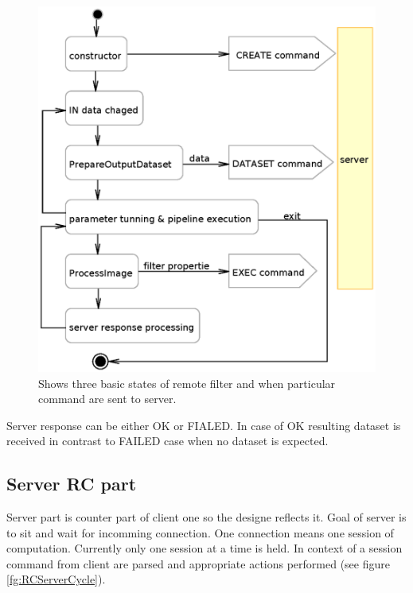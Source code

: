 \begin{figure}
    \centering
    \includegraphics[width=12cm]{data/RCClientCycle}
    \caption[Remote Medv4D filter]{Shows three basic states of remote filter and when particular command are sent to server.}
    \label{fg:RCClientCycle}
\end{figure}

Server response can be either OK or FIALED.
In case of OK resulting dataset is received in contrast to FAILED case when no dataset is expected.

\subsection{Server RC part}

Server part is counter part of client one so the designe reflects it.
Goal of server is to sit and wait for incomming connection.
One connection means one session of computation.
Currently only one session at a time is held.
In context of a session command from client are parsed and appropriate actions performed (see figure \ref{fg:RCServerCycle}).

